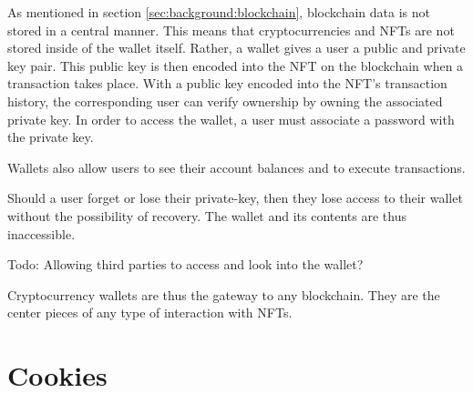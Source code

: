 As mentioned in section \ref{sec:background:blockchain}, blockchain data is not stored in a central manner. This means that cryptocurrencies and NFTs are not stored inside of the wallet itself. Rather, a wallet gives a user a public and private key pair. This public key is then encoded into the NFT on the blockchain when a transaction takes place. With a public key encoded into the NFT's transaction history, the corresponding user can verify ownership by owning the associated private key. In order to access the wallet, a user must associate a password with the private key. \cite{wallets2}

Wallets also allow users to see their account balances and to execute transactions. 

Should a user forget or lose their private-key, then they lose access to their wallet without the possibility of recovery. The wallet and its contents are thus inaccessible. \cite{wallets2}

Todo: Allowing third parties to access and look into the wallet?

Cryptocurrency wallets are thus the gateway to any blockchain. They are the center pieces of any type of interaction with NFTs.

%
%
\section{Cookies}
\label{sec:background:cookies}




